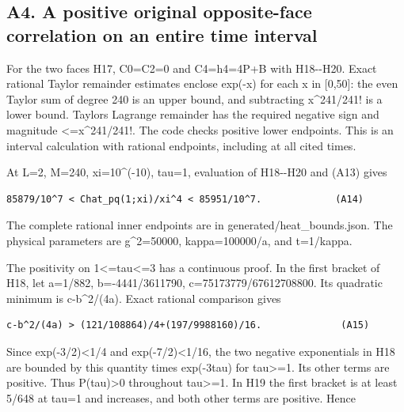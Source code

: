 \documentclass[11pt,a4paper]{article}
\renewcommand{\[}{\begingroup\small\originaldisplaystart}
\renewcommand{\]}{\originaldisplayend\endgroup}
\begin{document}
\subsection{A4. A positive original opposite-face correlation on an
entire time
interval}\label{a4.-a-positive-original-opposite-face-correlation-on-an-entire-time-interval}

For the two faces H17, C0=C2=0 and C4=h4=4P+B with H18-\/-H20. Exact
rational Taylor remainder estimates enclose exp(-x) for each x in
{[}0,50{]}: the even Taylor sum of degree 240 is an upper bound, and
subtracting x\^{}241/241! is a lower bound. Taylor\textquotesingle s
Lagrange remainder has the required negative sign and magnitude
\textless=x\^{}241/241!. The code checks positive lower endpoints. This
is an interval calculation with rational endpoints, including at all
cited times.

At L=2, M=240, xi=10\^{}(-10), tau=1, evaluation of H18-\/-H20 and (A13)
gives

\begin{verbatim}
85879/10^7 < Chat_pq(1;xi)/xi^4 < 85951/10^7.             (A14)
\end{verbatim}

The complete rational inner endpoints are in
{g\allowbreak{}e\allowbreak{}n\allowbreak{}e\allowbreak{}r\allowbreak{}a\allowbreak{}t\allowbreak{}e\allowbreak{}d\allowbreak{}/\allowbreak{}h\allowbreak{}e\allowbreak{}a\allowbreak{}t\allowbreak{}\_\allowbreak{}b\allowbreak{}o\allowbreak{}u\allowbreak{}n\allowbreak{}d\allowbreak{}s\allowbreak{}.\allowbreak{}j\allowbreak{}s\allowbreak{}o\allowbreak{}n\allowbreak{}.\allowbreak{}}
The physical parameters are g\^{}2=50000, kappa=100000/a, and t=1/kappa.

The positivity on 1\textless=tau\textless=3 has a continuous proof. In
the first bracket of H18, let a=1/882, b=-4441/3611790,
{c\allowbreak{}=\allowbreak{}7\allowbreak{}5\allowbreak{}1\allowbreak{}7\allowbreak{}3\allowbreak{}7\allowbreak{}7\allowbreak{}9\allowbreak{}/\allowbreak{}6\allowbreak{}7\allowbreak{}6\allowbreak{}1\allowbreak{}2\allowbreak{}7\allowbreak{}0\allowbreak{}8\allowbreak{}8\allowbreak{}0\allowbreak{}0\allowbreak{}.\allowbreak{}}
Its quadratic minimum is c-b\^{}2/(4a). Exact rational comparison gives

\begin{verbatim}
c-b^2/(4a) > (121/108864)/4+(197/9988160)/16.              (A15)
\end{verbatim}

Since exp(-3/2)\textless1/4 and exp(-7/2)\textless1/16, the two negative
exponentials in H18 are bounded by this quantity times exp(-3tau) for
tau\textgreater=1. Its other terms are positive. Thus
P(tau)\textgreater0 throughout tau\textgreater=1. In H19 the first
bracket is at least 5/648 at tau=1 and increases, and both other terms
are positive. Hence
\end{document}
